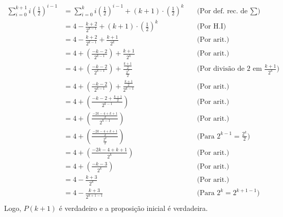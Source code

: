 \begin{align*}
	\sum\limits_{i = 0}^{k + 1} i(\frac{1}{2})^{i - 1} & = \sum\limits_{i = 0}^k i(\frac{1}{2})^{i - 1} + (k + 1)\cdot(\frac{1}{2})^k & \quad \text{(Por def. rec. de $\sum$)}                   \\
	                                                   & = 4 - \frac{k + 2}{2^{k - 1}} + (k + 1) \cdot(\frac{1}{2})^k                 & \quad \text{(Por H.I)}                                   \\
	                                                   & = 4 - \frac{k + 2}{2^{k - 1}} + \frac{k + 1}{2^k}                            & \quad \text{(Por arit.)}                                 \\
	                                                   & = 4 + (\frac{-k - 2}{2^{k - 1}}) + \frac{k + 1}{2^k}                         & \quad \text{(Por arit.)}                                 \\
	                                                   & = 4 + (\frac{-k - 2}{2^{k - 1}}) + \frac{\frac{k + 1}{2}}{\frac{2^k}{2}}     & \quad \text{(Por divisão de $2$ em $\frac{k + 1}{2^k}$)} \\
	                                                   & = 4 + (\frac{-k - 2}{2^{k - 1}}) + \frac{\frac{k + 1}{2}}{2^{k - 1}}         & \quad \text{(Por arit.)}                                 \\
	                                                   & = 4 + (\frac{-k - 2 + \frac{k + 1}{2}}{2^{k - 1}})                           & \quad \text{(Por arit.)}                                 \\
	                                                   & = 4 + (\frac{\frac{-2k - 4 + k + 1}{2}}{2^{k - 1}})                          & \quad \text{(Por arit.)}                                 \\
	                                                   & = 4 + (\frac{\frac{-2k - 4 + k + 1}{2}}{\frac{2^k}{2}})                      & \quad \text{(Para $2^{k - 1} = \frac{2^k}{2}$)}          \\
	                                                   & = 4 + (\frac{-2k - 4 + k + 1}{2^k})                                          & \quad \text{(Por arit.)}                                 \\
	                                                   & = 4 + (\frac{-k - 3}{2^k})                                                   & \quad \text{(Por arit.)}                                 \\
	                                                   & = 4 - \frac{k + 3}{2^k}                                                      & \quad \text{(Por arit.)}                                 \\
	                                                   & = 4 - \frac{k + 3}{2^{k + 1 - 1}}                                            & \quad \text{(Para $2^k = 2^{k + 1 - 1}$)}                \\
\end{align*}
Logo, $P(k + 1)$ é verdadeiro e a proposição inicial é verdadeira.

